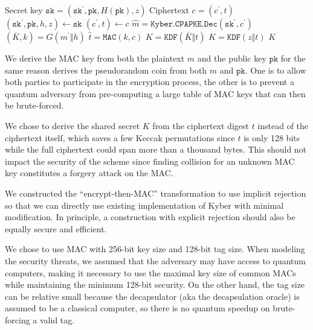 \documentclass[floatrow,journal=tches,submission]{iacrtrans}
\newcommand{\mac}{\texttt{MAC}}
\newcommand{\pk}{\texttt{pk}}
\newcommand{\sk}{\texttt{sk}}
\begin{document}
\begin{algorithm}[H]
    \caption{$\texttt{Kyber.CCAKEM.Decap}^+ (\sk, c)$}\label{alg:kyber-ae-decap}
    \begin{algorithmic}[1]
        \Require Secret key $\sk = (\sk^\prime, \pk, H(\pk), z)$
        \Require Ciphertext $c = (c^\prime, t)$
        \State $(\sk^\prime, \pk, h, z) \leftarrow \sk$
        \State $(c^\prime, t) \leftarrow c$
        \State $\hat{m} = \texttt{Kyber.CPAPKE.Dec}(\sk^\prime, c^\prime)$ 
        \State $(\overline{K}, k) =   G(m^\prime \Vert h)$
        \State $\hat{t}=\mac(k, c)$
            \State $K  = \texttt{KDF}(\bar{K} \Vert t)$ 
         \Else 
            \State $K  = \texttt{KDF}(z \Vert t)$ 
        \EndIf
            \State \Return $K$
    \end{algorithmic}
\end{algorithm}

\begin{remark}
    We derive the MAC key from both the plaintext $m$ and the public key $\pk$ for the same reason \cite{avanzi2019crystals} derives the pseudorandom coin from both $m$ and $\pk$. One is to allow both parties to participate in the encryption process, the other is to prevent a quantum adversary from pre-computing a large table of MAC keys that can then be brute-forced.
\end{remark}
\begin{remark}
    We chose to derive the shared secret $K$ from the ciphertext digest $t$ instead of the ciphertext itself, which saves a few Keccak permutations since $t$ is only 128 bits while the full ciphertext could span more than a thousand bytes. This should not impact the security of the scheme since finding collision for an unknown MAC key constitutes a forgery attack on the MAC.
\end{remark}
\begin{remark}
    We constructed the ``encrypt-then-MAC'' transformation to use implicit rejection so that we can directly use existing implementation of Kyber with minimal modification. In principle, a construction with explicit rejection should also be equally secure and efficient.
\end{remark}
\begin{remark}
    We chose to use MAC with 256-bit key size and 128-bit tag size. When modeling the security threats, we assumed that the adversary may have access to quantum computers, making it necessary to use the maximal key size of common MACs while maintaining the minimum 128-bit security. On the other hand, the tag size can be relative small because the decapsulator (aka the decapsulation oracle) is assumed to be a classical computer, so there is no quantum speedup on brute-forcing a valid tag.
\end{remark}
\end{document}
